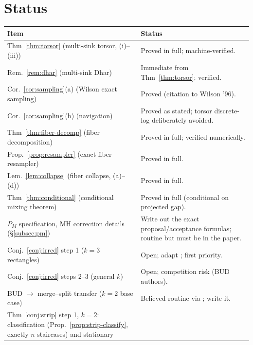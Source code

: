 \documentclass[11pt]{article}
\begin{document}
\section{Status}
\label{app:status}

\begin{center}
\begin{tabular}{p{7.6cm} p{6.8cm}}
\hline
\textbf{Item} & \textbf{Status} \\
\hline
Thm~\ref{thm:torsor} (multi-sink torsor, (i)--(iii)) &
  \textcolor{donecol}{Proved in full; machine-verified.} \\
Rem.~\ref{rem:dhar} (multi-sink Dhar) &
  \textcolor{donecol}{Immediate from Thm~\ref{thm:torsor}; verified.} \\
Cor.~\ref{cor:sampling}(a) (Wilson exact sampling) &
  \textcolor{donecol}{Proved (citation to Wilson '96).} \\
Cor.~\ref{cor:sampling}(b) (navigation) &
  \textcolor{donecol}{Proved as stated;}
  \textcolor{notecol}{torsor discrete-log deliberately avoided.} \\
Thm~\ref{thm:fiber-decomp} (fiber decomposition) &
  \textcolor{donecol}{Proved in full; verified numerically.} \\
Prop.~\ref{prop:resampler} (exact fiber resampler) &
  \textcolor{donecol}{Proved in full.} \\
Lem.~\ref{lem:collapse} (fiber collapse, (a)--(d)) &
  \textcolor{donecol}{Proved in full.} \\
Thm~\ref{thm:conditional} (conditional mixing theorem) &
  \textcolor{donecol}{Proved in full (conditional on projected gap).} \\
$P_M$ specification, MH correction details (\S\ref{subsec:pm}) &
  \textcolor{misscol}{Write out the exact proposal/acceptance formulas;
  routine but must be in the paper.} \\
Conj.~\ref{conj:irred} step 1 ($k=3$ rectangles) &
  \textcolor{misscol}{Open; adapt \cite[App.~B]{akitaya2026bud};
  first priority.} \\
Conj.~\ref{conj:irred} steps 2--3 (general $k$) &
  \textcolor{misscol}{Open; competition risk (BUD authors).} \\
BUD $\to$ merge--split transfer ($k=2$ base case) &
  \textcolor{misscol}{Believed routine via \cite[Lem.~A.3--A.5]{akitaya2026bud};
  write it.} \\
Thm~\ref{conj:strip} step 1, $k = 2$: classification
(Prop.~\ref{prop:strip-classify}, exactly $n$ staircases) and stationary

\end{tabular}
\end{center}
\end{document}
